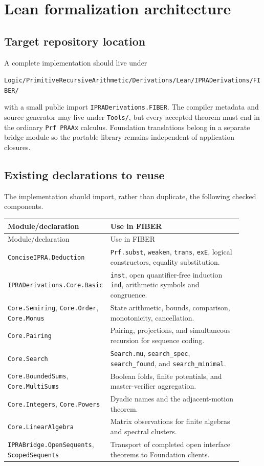 \section{Lean formalization architecture}
\label{sec:lean}

\subsection{Target repository location}

A complete implementation should live under
\begin{center}
\texttt{Logic/PrimitiveRecursiveArithmetic/Derivations/Lean/IPRADerivations/FIBER/}
\end{center}
with a small public import
\texttt{IPRADerivations.FIBER}.  The compiler metadata and source generator may
live under \texttt{Tools/}, but every accepted theorem must end in the ordinary
\texttt{Prf PRAAx} calculus.  Foundation translations belong in a separate
bridge module so the portable library remains independent of application
closures.

\subsection{Existing declarations to reuse}

The implementation should import, rather than duplicate, the following checked
components.

\begin{longtable}{p{0.35\linewidth}p{0.56\linewidth}}
\toprule
Module/declaration & Use in FIBER\\
\midrule
\endfirsthead
\toprule
Module/declaration & Use in FIBER\\
\midrule
\endhead
\texttt{ConciseIPRA.Deduction} & \texttt{Prf.subst}, \texttt{weaken}, \texttt{trans}, \texttt{exE}, logical constructors, equality substitution.\\
\texttt{IPRADerivations.Core.Basic} & \texttt{inst}, open quantifier-free induction \texttt{ind}, arithmetic symbols and congruence.\\
\texttt{Core.Semiring}, \texttt{Core.Order}, \texttt{Core.Monus} & State arithmetic, bounds, comparison, monotonicity, cancellation.\\
\texttt{Core.Pairing} & Pairing, projections, and simultaneous recursion for sequence coding.\\
\texttt{Core.Search} & \texttt{Search.mu}, \texttt{search\_spec}, \texttt{search\_found}, and \texttt{search\_minimal}.\\
\texttt{Core.BoundedSums}, \texttt{Core.MultiSums} & Boolean folds, finite potentials, and master-verifier aggregation.\\
\texttt{Core.Integers}, \texttt{Core.Powers} & Dyadic names and the adjacent-motion theorem.\\
\texttt{Core.LinearAlgebra} & Matrix observations for finite algebras and spectral clusters.\\
\texttt{IPRABridge.OpenSequents}, \texttt{ScopedSequents} & Transport of completed open interface theorems to Foundation clients.\\
\bottomrule
\end{longtable}

